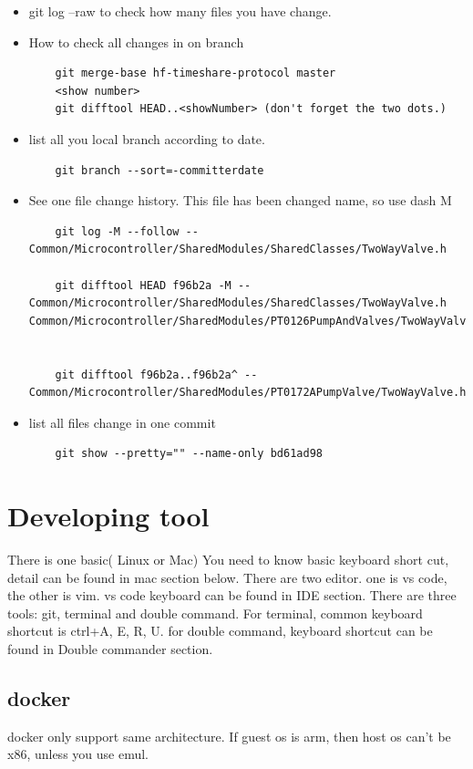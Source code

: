 \documentclass[a4paper,11pt,twoside]{book}
\begin{document}
\begin{itemize}
	\item git log --raw to check how many files you have change. 
	
	\item How to check all changes in on branch
\begin{lstlisting}
	git merge-base hf-timeshare-protocol master
	<show number>
	git difftool HEAD..<showNumber> (don't forget the two dots.)
\end{lstlisting}

	\item list all you local branch according to date. 
\begin{lstlisting}
	git branch --sort=-committerdate
\end{lstlisting}

	\item See one file change history. This file has been changed name, so use dash M
\begin{lstlisting}
	git log -M --follow -- Common/Microcontroller/SharedModules/SharedClasses/TwoWayValve.h
	
	git difftool HEAD f96b2a -M -- Common/Microcontroller/SharedModules/SharedClasses/TwoWayValve.h Common/Microcontroller/SharedModules/PT0126PumpAndValves/TwoWayValve.h
	
	
	git difftool f96b2a..f96b2a^ -- Common/Microcontroller/SharedModules/PT0172APumpValve/TwoWayValve.h	
\end{lstlisting}

	\item list all files change in one commit 
\begin{lstlisting}
	git show --pretty="" --name-only bd61ad98 
\end{lstlisting}

\end{itemize}


\chapter{Developing tool}

There is one basic( Linux or Mac) You need to know basic keyboard short cut,  detail can be found in mac section below.  There are two editor.  one is vs code, the other is vim.  vs code keyboard can be found in IDE section.  There are three tools: git, terminal and double command.  For terminal, common keyboard shortcut is ctrl+A, E, R, U. for double command, keyboard shortcut can be found in Double commander section. 

\section{docker}
docker only support same architecture. If guest os is arm, then host os can't be x86, unless you use emul. 
\end{document}
